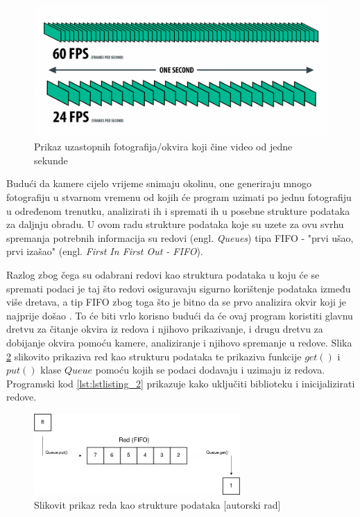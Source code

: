 \documentclass{foi}
\begin{document}
\begin{figure}[h!]
    \centering
    \includegraphics[width=1\textwidth]{slike/frames-per-second-diagram}
    \caption{Prikaz uzastopnih fotografija/okvira koji čine video od jedne sekunde \cite{AnimoticaBlog2020}}
    \label{fig:slika_frame}
\end{figure}

Budući da kamere cijelo vrijeme snimaju okolinu, one generiraju mnogo fotografiju u stvarnom vremenu od kojih će program uzimati po jednu fotografiju u određenom trenutku, analizirati ih i spremati ih u posebne strukture podataka za daljnju obradu. U ovom radu strukture podataka koje su uzete za ovu svrhu spremanja potrebnih informacija su redovi (engl. \emph{Queues}) tipa FIFO - "prvi ušao, prvi izašao" (engl. \emph{First In First Out - FIFO}).

Razlog zbog čega su odabrani redovi kao struktura podataka u koju će se spremati podaci je taj što redovi osiguravaju sigurno korištenje podataka između više dretava, a tip FIFO zbog toga što je bitno da se prvo analizira okvir koji je najprije došao \cite{PythonSoftwareFoundation}. To će biti vrlo korisno budući da će ovaj program koristiti glavnu dretvu za čitanje okvira iz redova i njihovo prikazivanje, i drugu dretvu za dobijanje okvira pomoću kamere, analiziranje i njihovo spremanje u redove. Slika \ref{fig:dijagram_red} slikovito prikaziva red kao strukturu podataka te prikaziva funkcije $get()$ i $put()$ klase $Queue$ pomoću kojih se podaci dodavaju i uzimaju iz redova. Programski kod \ref{lst:lstlisting_2} prikazuje kako uključiti biblioteku i inicijalizirati redove.

\begin{figure}[h!]
    \centering
    \includegraphics[width=0.7\textwidth]{slike/redovi_dijagram}
    \caption{Slikovit prikaz reda kao strukture podataka [autorski rad]}
    \label{fig:dijagram_red}
\end{figure}
\end{document}
